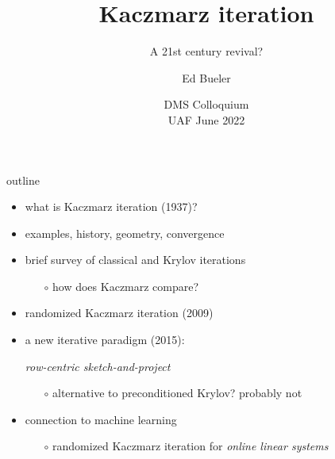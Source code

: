 \documentclass[usepdftitle=false,usenames,dvipsnames]{beamer}
\title{Kaczmarz iteration}
\subtitle{A 21st century revival?}
\author{Ed Bueler}
\date{DMS Colloquium \\ UAF June 2022}
\begin{document}
\begin{frame}
	\maketitle
\end{frame}


\begin{frame}{outline}

\begin{itemize}
\item what is Kaczmarz iteration (1937)?
\item examples, history, geometry, convergence
\item brief survey of classical and Krylov iterations
    \begin{itemize}
    \item[$\circ$] how does Kaczmarz compare?
    \end{itemize}
\item randomized Kaczmarz iteration (2009)
\item a new iterative paradigm (2015):

\begin{center}
\emph{row-centric sketch-and-project}
\end{center}

    \begin{itemize}
    \item[$\circ$] alternative to preconditioned Krylov? probably not
    \end{itemize}
\item connection to machine learning
    \begin{itemize}
    \item[$\circ$] randomized Kaczmarz iteration for \emph{online linear systems}
    \end{itemize}
\end{itemize}
\end{frame}
\end{document}
